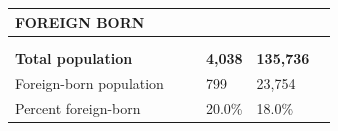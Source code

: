 \documentclass[9pt]{report}
\begin{document}
\newpage
\setlength{\tabcolsep}{.01in} %
\begin{tabular}{p{.10in}p{.10in}p{.10in}p{3.7in}>{\hfill}p{.85in}>{\hfill}p{.85in}>{\hfill}p{.85in}>{\hfill}p{.85in}p{0.1in}}
\multicolumn{9}{l}{\parbox{7.1in}{\raggedright{\large{\strut\textbf{FOREIGN BORN}\strut}}}} \\ 
\hline
\multicolumn{4}{l}{\parbox{3.5in}{\raggedright{\textbf{}}}} & \multicolumn{1}{r}{\parbox{.85in}{\strut\raggedleft{\textbf{}\strut}}} & \multicolumn{1}{r}{\parbox{.85in}{\strut\raggedleft{\textbf{}\strut}}} & \multicolumn{1}{r}{\parbox{.85in}{\strut{}}} & \multicolumn{1}{r}{\parbox{.85in}{\strut{}}} & \\ 
\multicolumn{9}{l}{} \\ 
\multicolumn{4}{l}{\parbox{3.5in}{\strut\raggedright{\textbf{Total population}\strut}}} & \textbf{} & \textbf{} & \textbf{4,038} & \textbf{135,736} & \textbf{} \\ 
\multicolumn{4}{l}{\parbox{3.6in}{\strut\raggedright{{Foreign-born population}}\strut}} &  &  & 799 & 23,754 & \multicolumn{1}{l}{}  \\ 
\multicolumn{4}{l}{\parbox{3.6in}{\strut\raggedright{{Percent foreign-born}}\strut}} &  &  & 20.0\% & 18.0\% & \multicolumn{1}{l}{}  \\ 

\end{tabular}
\setlength{\tabcolsep}{6pt} %
\end{document}
